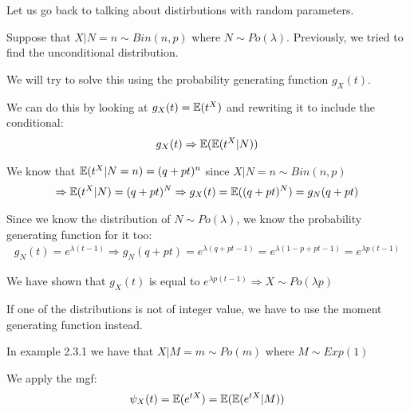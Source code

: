 \par\bigskip
\noindent Let us go back to talking about distirbutions with random parameters.
\par\bigskip
\noindent Suppose that $X|N = n\sim Bin(n,p)$ where $N\sim Po(\lambda)$. Previously, we tried to find the unconditional distribution.\par
\noindent We will try to solve this using the probability generating function $g_X(t)$. \par
\noindent We can do this by looking at $g_X(t) = \mathbb{E}(t^X)$ and rewriting it to include the conditional:
\begin{equation*}
  \begin{gathered}
    g_X(t)\Rightarrow \mathbb{E}(\mathbb{E}(t^X|N))
  \end{gathered}
\end{equation*}\par
\noindent We know that $\mathbb{E}(t^X|N = n) = (q+pt)^n$ since $X|N = n\sim Bin(n,p)$
\begin{equation*}
  \begin{gathered}
    \Rightarrow \mathbb{E}(t^X|N) = (q+pt)^N \Rightarrow g_X(t) = \mathbb{E}((q+pt)^N) = g_N(q+pt)
  \end{gathered}
\end{equation*}\par
\noindent Since we know the distribution of $N\sim Po(\lambda)$, we know the probability generating function for it too:
\begin{equation*}
  \begin{gathered}
    g_N(t) = e^{\lambda(t-1)}\Rightarrow g_N(q+pt) = e^{\lambda(q+pt-1)} = e^{\lambda(1-p+pt-1)} = e^{\lambda p(t-1)}
  \end{gathered}
\end{equation*}
\par\bigskip
\noindent We have shown that $g_X(t)$ is equal to $e^{\lambda p(t-1)}\Rightarrow X\sim Po(\lambda p)$
\par\bigskip
\noindent If one of the distributions is not of integer value, we have to use the moment generating function instead.
\par\bigskip
\noindent In example 2.3.1 we have that $X|M = m\sim Po(m)$ where $M\sim Exp(1)$\par
\noindent We apply the mgf:
\begin{equation*}
  \begin{gathered}
    \psi_X(t) = \mathbb{E}(e^{tX}) = \mathbb{E}(\mathbb{E}(e^{tX}|M))
  \end{gathered}
\end{equation*}\par
